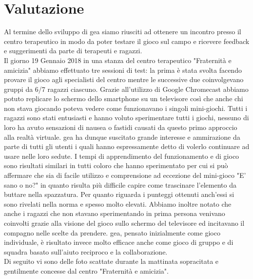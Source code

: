 \section{Valutazione} \label{sec:val}
Al termine dello sviluppo di \acs{gea} siamo riusciti ad ottenere un incontro presso il centro terapeutico in modo da poter testare il gioco sul campo e ricevere feedback e suggerimenti da parte di terapeuti e ragazzi.\\
Il giorno 19 Gennaio 2018 in una stanza del centro terapeutico "Fraternità e amicizia" abbiamo effettuato tre sessioni di test: la prima è stata svolta facendo provare il gioco agli specialisti del centro mentre le successive due coinvolgevano gruppi da 6/7 ragazzi ciascuno. Grazie all'utilizzo di Google Chromecast abbiamo potuto replicare lo schermo dello smartphone su un televisore così che anche chi non stava giocando poteva vedere come funzionavano i singoli mini-giochi. Tutti i ragazzi sono stati entusiasti e hanno voluto sperimentare tutti i giochi, nessuno di loro ha avuto sensazioni di nausea o fastidi causati da questo primo approccio alla realtà virtuale. \acs{gea} ha dunque suscitato grande interesse e ammirazione da parte di tutti gli utenti i quali hanno espressamente detto di volerlo continuare ad usare nelle loro sedute. I tempi di apprendimento del funzionamento e di gioco sono risultati similari in tutti coloro che hanno sperimentato per cui si può affermare che sia di facile utilizzo e comprensione ad eccezione del mini-gioco "E' sano o no?" in quanto risulta più difficile capire come trascinare l'elemento da buttare nella spazzatura. Per quanto riguarda i punteggi ottenuti anch'essi si sono rivelati nella norma e spesso molto elevati. Abbiamo inoltre notato che anche i ragazzi che non stavano sperimentando in prima persona venivano coinvolti grazie alla visione del gioco sullo schermo del televisore ed incitavano il compagno nelle scelte da prendere. \acs{gea}, pensato inizialmente come gioco individuale, è risultato invece molto efficace anche come gioco di gruppo e di squadra basato sull'aiuto reciproco e la collaborazione. \\
Di seguito vi sono delle foto scattate durante la mattinata sopracitata e gentilmente concesse dal centro "Fraternità e amicizia".
